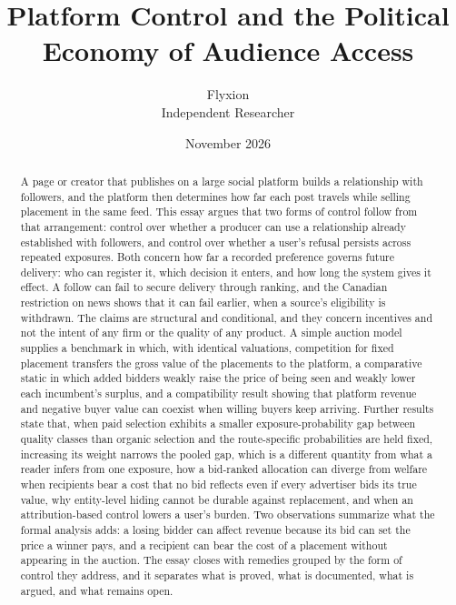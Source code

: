 \documentclass[11pt]{article}
\title{Platform Control and the Political Economy of Audience Access}
\author{Flyxion\\Independent Researcher}
\date{November 2026}
\theoremstyle{definition}
\begin{document}
\maketitle

\begin{abstract}
A page or creator that publishes on a large social platform builds a relationship with followers, and the platform then determines how far each post travels while selling placement in the same feed. This essay argues that two forms of control follow from that arrangement: control over whether a producer can use a relationship already established with followers, and control over whether a user's refusal persists across repeated exposures. Both concern how far a recorded preference governs future delivery: who can register it, which decision it enters, and how long the system gives it effect. A follow can fail to secure delivery through ranking, and the Canadian restriction on news shows that it can fail earlier, when a source's eligibility is withdrawn. The claims are structural and conditional, and they concern incentives and not the intent of any firm or the quality of any product. A simple auction model supplies a benchmark in which, with identical valuations, competition for fixed placement transfers the gross value of the placements to the platform, a comparative static in which added bidders weakly raise the price of being seen and weakly lower each incumbent's surplus, and a compatibility result showing that platform revenue and negative buyer value can coexist when willing buyers keep arriving. Further results state that, when paid selection exhibits a smaller exposure-probability gap between quality classes than organic selection and the route-specific probabilities are held fixed, increasing its weight narrows the pooled gap, which is a different quantity from what a reader infers from one exposure, how a bid-ranked allocation can diverge from welfare when recipients bear a cost that no bid reflects even if every advertiser bids its true value, why entity-level hiding cannot be durable against replacement, and when an attribution-based control lowers a user's burden. Two observations summarize what the formal analysis adds: a losing bidder can affect revenue because its bid can set the price a winner pays, and a recipient can bear the cost of a placement without appearing in the auction. The essay closes with remedies grouped by the form of control they address, and it separates what is proved, what is documented, what is argued, and what remains open.
\end{abstract}
\end{document}
